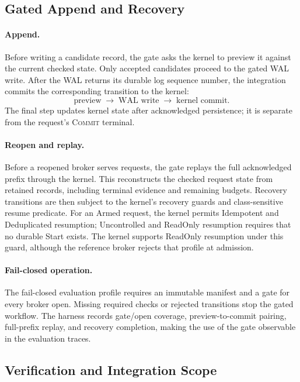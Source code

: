 \documentclass[acmsmall,screen,review,anonymous]{acmart}
\newcommand{\Commit}{\textsc{Commit}\xspace}
\begin{document}
\subsection{Gated Append and Recovery}

\paragraph{Append.}
Before writing a candidate record, the gate asks the kernel to
preview it against the current checked state. Only accepted candidates proceed to the gated WAL write. After the WAL
returns its durable log sequence number, the integration commits
the corresponding transition to the kernel:
\[
  \text{preview}
  \;\longrightarrow\;
  \text{WAL write}
  \;\longrightarrow\;
  \text{kernel commit}.
\]
The final step updates kernel state after acknowledged persistence; it is
separate from the request's \Commit terminal.

\paragraph{Reopen and replay.}
Before a reopened broker serves requests, the gate replays the
full acknowledged prefix through the kernel. This reconstructs
the checked request state from retained records, including
terminal evidence and remaining budgets. Recovery transitions
are then subject to the kernel's recovery guards and
class-sensitive resume predicate. For an Armed request, the kernel permits
Idempotent and Deduplicated resumption; Uncontrolled and ReadOnly resumption
requires that no durable Start exists. The kernel supports ReadOnly resumption under this guard, although the
reference broker rejects that profile at admission.

\paragraph{Fail-closed operation.}
The fail-closed evaluation profile requires an immutable manifest
and a gate for every broker open. Missing required checks or
rejected transitions stop the gated workflow. The harness records gate/open coverage,
preview-to-commit pairing, full-prefix replay, and recovery
completion, making the use of the gate observable in the
evaluation traces.

\subsection{Verification and Integration Scope}
\end{document}
